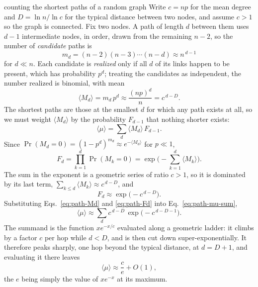 \begin{calculation}{counting the shortest paths of a random graph}
Write $c=np$ for the mean degree and $D=\ln n/\ln c$ for the typical distance
between two nodes, and assume $c>1$ so the graph is connected. Fix two nodes. A
path of length $d$ between them uses $d-1$ intermediate nodes, in order, drawn from
the remaining $n-2$, so the number of \emph{candidate} paths is
\begin{equation}
  m_d = (n-2)(n-3)\cdots(n-d) \approx n^{\,d-1}
  \label{eq:path-md}
\end{equation}
for $d\ll n$. Each candidate is \emph{realized} only if all $d$ of its links happen
to be present, which has probability $p^d$; treating the candidates as independent,
the number realized is binomial, with mean
\begin{equation}
  \langle M_d\rangle = m_d\,p^{d} \approx \frac{(np)^{d}}{n} = c^{\,d-D}.
  \label{eq:path-Md}
\end{equation}
The shortest paths are those at the smallest $d$ for which any path exists at all,
so we must weight $\langle M_d\rangle$ by the probability $F_{d-1}$ that nothing
shorter exists:
\begin{equation}
  \langle\mu\rangle = \sum_{d}\langle M_d\rangle\,F_{d-1}.
  \label{eq:path-mu-sum}
\end{equation}
Since $\Pr(M_d=0)=(1-p^d)^{m_d}\approx e^{-\langle M_d\rangle}$ for $p\ll1$,
\begin{equation}
  F_d = \prod_{k=1}^{d}\Pr(M_k=0) = \exp\Big(-\sum_{k=1}^{d}\langle M_k\rangle\Big).
  \label{eq:path-Fsum}
\end{equation}
The sum in the exponent is a geometric series of ratio $c>1$, so it is dominated by
its last term, $\sum_{k\le d}\langle M_k\rangle\approx c^{\,d-D}$, and
\begin{equation}
  F_d \approx \exp\big(-c^{\,d-D}\big).
  \label{eq:path-Fd}
\end{equation}
Substituting Eqs.~\eqref{eq:path-Md} and \eqref{eq:path-Fd} into
Eq.~\eqref{eq:path-mu-sum},
\begin{equation}
  \langle\mu\rangle \approx \sum_{d} c^{\,d-D}\,\exp\big(-c^{\,d-D-1}\big).
  \label{eq:path-ersum}
\end{equation}
The summand is the function $x e^{-x/c}$ evaluated along a geometric ladder: it
climbs by a factor $c$ per hop while $d<D$, and is then cut down
super-exponentially. It therefore peaks sharply, one hop beyond the typical
distance, at $d=D+1$, and evaluating it there leaves
\begin{equation}
  \langle\mu\rangle \approx \frac{c}{e} + O(1),
  \label{eq:path-mfER}
\end{equation}
the $e$ being simply the value of $x e^{-x}$ at its maximum.
\end{calculation}

